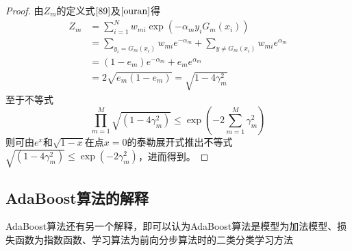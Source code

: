 \begin{proof}
	由$Z_m$的定义式$\ref{89}$及$\ref{ouran}$得
	\begin{equation}
	\begin{aligned}
		Z_m&=\sum_{i=1}^{N}w_{mi}\exp(-\alpha_my_iG_m(x_i))\\
		&=\sum_{y_i=G_m(x_i)}w_{mi}e^{-\alpha_m}+\sum_{y\ne G_m(x_i)}w_{mi}e^{\alpha_m}\\
		&=(1-e_m)e^{-\alpha_m}+e_me^{\alpha_m}\\
		&=2\sqrt{e_m(1-e_m)}=\sqrt{1-4\gamma_m^2}
	\end{aligned}
	\end{equation}
	至于不等式
	\begin{equation}
		\prod_{m=1}^{M}\sqrt{(1-4\gamma_m^2)}\leqslant \exp\left(-2\sum_{m=1}^{M}\gamma_m^2 \right)
	\end{equation}
	则可由$e^x$和$\sqrt{1-x}$在点$x=0$的泰勒展开式推出不等式$\sqrt{(1-4\gamma_m^2)}\leqslant \exp(-2\gamma_m^2)$，进而得到。
\end{proof}
\subsection*{AdaBoost算法的解释}
AdaBoost算法还有另一个解释，即可以认为AdaBoost算法是模型为加法模型、损失函数为指数函数、学习算法为前向分步算法时的二类分类学习方法